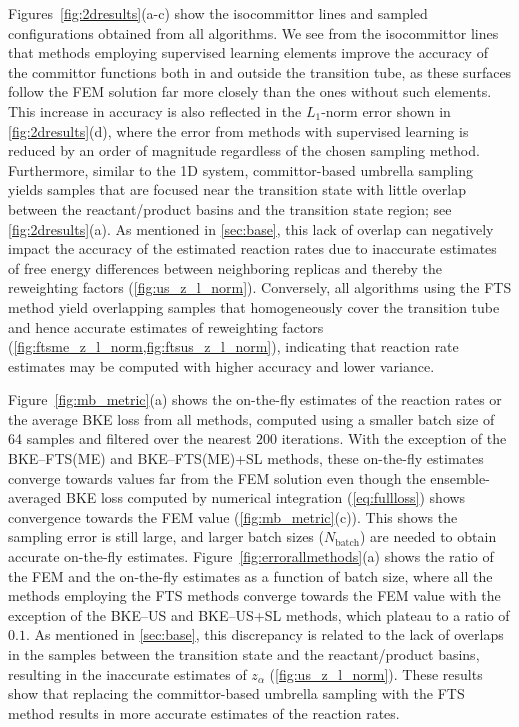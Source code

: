 \documentclass{article}
\numberwithin{equation}{section}
\theoremstyle{definition}
\theoremstyle{remark}
\begin{document}
Figures~\ref{fig:2dresults}(a-c) show the isocommittor lines and sampled configurations obtained from all algorithms. We see from the isocommittor lines that methods employing supervised learning elements improve the accuracy of the committor functions both in and outside the transition tube, as these surfaces follow the FEM solution far more closely than the ones without such elements. 
This increase in accuracy is also reflected in the $L_{1}$-norm error shown in \cref{fig:2dresults}(d), where the error from methods with supervised learning is reduced by an order of magnitude regardless of the chosen sampling method. 
Furthermore, similar to the 1D system, committor-based umbrella sampling yields samples that are focused near the transition state with little overlap between the reactant/product basins and the transition state region; see \cref{fig:2dresults}(a). As mentioned in \cref{sec:base}, this lack of overlap can negatively impact the accuracy of the estimated reaction rates due to inaccurate estimates of free energy differences between neighboring replicas and thereby the reweighting factors (\cref{fig:us_z_l_norm}).
Conversely, all algorithms using the FTS method yield overlapping samples that homogeneously cover the transition tube and hence accurate estimates of reweighting factors (\cref{fig:ftsme_z_l_norm,fig:ftsus_z_l_norm}), indicating that reaction rate estimates may be computed with higher accuracy and lower variance.

Figure~\ref{fig:mb_metric}(a) shows the on-the-fly estimates of the reaction rates or the average BKE loss from all methods, computed using a smaller batch size of 64 samples and filtered over the nearest $200$ iterations.  With the exception of the BKE--FTS(ME) and BKE--FTS(ME)+SL methods, these on-the-fly estimates converge towards values far from the FEM solution even though the ensemble-averaged BKE loss computed by numerical integration (\cref{eq:fullloss}) shows convergence towards the FEM value (\cref{fig:mb_metric}(c)). 
This shows the sampling error is still large, and larger batch sizes ($N_\mathrm{batch}$) are needed to obtain accurate on-the-fly estimates. Figure~\ref{fig:errorallmethods}(a) shows the ratio of the FEM and the on-the-fly estimates as a function of batch size, where all the methods employing the FTS methods converge towards the FEM value with the exception of the BKE--US and BKE--US+SL methods, which plateau to a ratio of $0.1$. As mentioned in \cref{sec:base}, this discrepancy is related to the lack of overlaps in the samples between the transition state and the reactant/product basins, resulting in the inaccurate estimates of $z_\alpha$ (\cref{fig:us_z_l_norm}). 
These results show that replacing the committor-based umbrella sampling with the FTS method results in more accurate estimates of the reaction rates.
\end{document}
